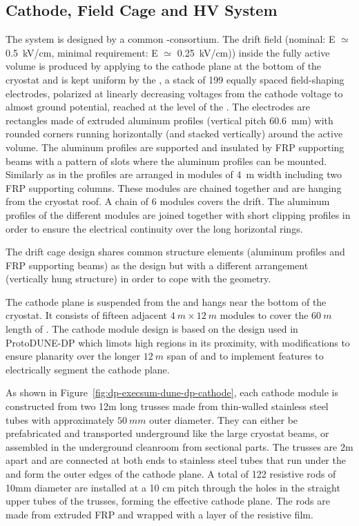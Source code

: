 \subsection{Cathode, Field Cage and HV System}
\label{sec:dp-execsum-cathode}

The  system is designed by a common \single{}-\dual consortium.
The drift field (nominal: E ${\simeq}$ \SI{0.5}{kV/cm}, minimal requirement: E ${\simeq}$ \SI{0.25}{kV/cm})) inside the fully active \lar volume is produced by applying  to the cathode plane at the bottom of the cryostat and is kept uniform by the , a stack of \num{199} equally spaced field-shaping electrodes,  polarized at linearly decreasing voltages from the cathode  voltage to almost ground potential, reached at the level of the . The electrodes are rectangles made of extruded aluminum profiles (vertical pitch \SI{60.6}{mm}) with rounded corners running horizontally (and stacked vertically) around the active volume. The aluminum profiles are supported and insulated by FRP supporting beams with a pattern of slots where the aluminum profiles can be mounted. Similarly as in  the profiles are arranged in modules of \SI{4}{m} width including two FRP supporting columns. These modules are chained together and  are hanging from the cryostat roof. A chain of \num{6} modules covers the \dpmaxdrift drift. The aluminum profiles of the different modules are joined together with short clipping profiles in order to ensure the electrical continuity over the \dptpclen long horizontal rings. 

The drift cage design shares common structure elements (aluminum profiles and FRP supporting beams) as the \single {} design but with a different arrangement (vertically hung structure) in order to cope with the  geometry.

The cathode plane  is suspended from the  and hangs near the  bottom of the cryostat. It consists of fifteen adjacent $4~m \times 12~m$ modules to cover the $60~m$ length of . The cathode module design is based on the design used in ProtoDUNE-DP which limots high \efield
regions in its proximity, with modifications to ensure planarity over the longer $12~m$ span of  and to implement features to electrically segment the cathode plane.

As shown in  Figure~\ref{fig:dp-execsum-dune-dp-cathode}, each cathode module is constructed from two 12m long trusses made from thin-walled stainless steel tubes with approximately $50~mm$ outer diameter. They can either be prefabricated and transported underground like the large cryostat beams, or assembled in the underground cleanroom from sectional parts. The trusses are 2m apart and are connected at both ends to stainless steel tubes that run under the  and form the outer edges of the cathode plane. A total of 122 resistive rods of 10mm diameter are installed at a 10 cm pitch through the holes in the straight upper tubes of the trusses, forming the effective cathode plane. The rods are made from extruded FRP and wrapped with a layer of the resistive film.

